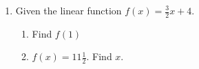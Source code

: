 \documentclass[12pt, twoside]{article}
\begin{document}
\begin{enumerate}
\item Given the linear function $f(x)=\frac{3}{2}x+4$.
\begin{multicols}{2}
\begin{enumerate}
  \item Find $f(1)$ %
  \item $f(x)=11 \frac{1}{2}$. Find $x$. %
\end{enumerate}
\end{multicols}


\end{enumerate}
\end{document}
